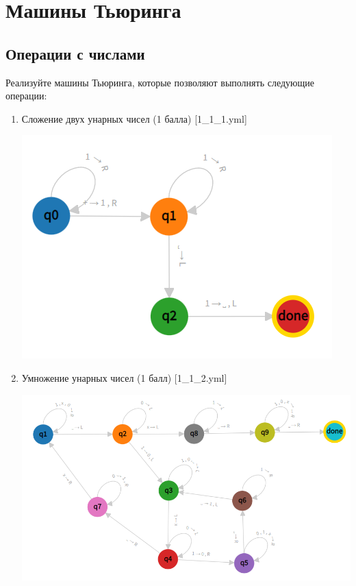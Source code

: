 \documentclass[a4paper,12pt]{article}
\begin{document}


\newpage
\tableofcontents

\newpage

\section{Машины Тьюринга}

\subsection{Операции с числами}

Реализуйте машины Тьюринга, которые позволяют выполнять следующие операции:
\begin{enumerate}
    \item Сложение двух унарных чисел (1 балла) [1\_1\_1.yml]
    
    \begin{center}
        \includegraphics[scale=0.8]{img/1_1_1.png}
    \end{center}
    
    \item Умножение унарных чисел (1 балл) [1\_1\_2.yml]
    
    \begin{center}
        \includegraphics[scale=0.8]{img/1_1_2.png}
    \end{center}
\end{enumerate}
\end{document}
